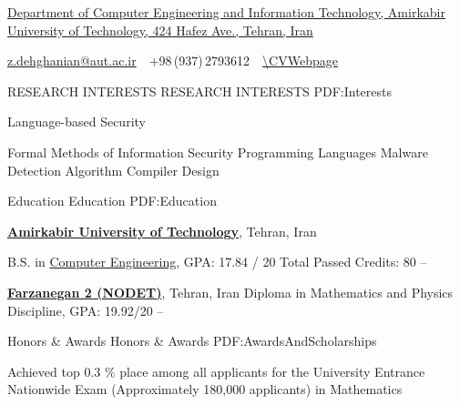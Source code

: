 \documentclass[letterpaper,MMMyyyy,nonstopmode]{simpleresumecv}
\newcommand{\CVAuthor}{Zahra Dehghanian}
\begin{document}

\Title{\CVAuthor}
\hline
\begin{SubTitle}
\href{https://www.google.com/maps/place/Amirkabir+University+of+Technology+(Polytechnic}
{Department of Computer Engineering and Information Technology, Amirkabir University of Technology, 424 Hafez Ave., Tehran, Iran}
\par
\href{mailto:z.dehghanian@aut.ac.ir}
{z.dehghanian@aut.ac.ir}
\,\SubBulletSymbol\,
+98\,(937)\,2793612
\,\SubBulletSymbol\,
\href{\CVWebpage}
{\url{\CVWebpage}}
\end{SubTitle}

\begin{Body}


\Section
{RESEARCH INTERESTS}
{RESEARCH INTERESTS}
{PDF:Interests}

\Entry

\BulletItem
Language-based Security


\BulletItem
Formal Methods of Information Security
\BulletItem
Programming Languages
\BulletItem
Malware Detection Algorithm
\BulletItem
Compiler Design


\Section
{Education}
{Education}
{PDF:Education}

\Entry
\Entry
\href{http://www.aut.ac.ir}
{\textbf{Amirkabir University of Technology}},
Tehran, Iran

\Gap
\BulletItem
B.S. in
\href{http://ceit.aut.ac.ir}
{Computer Engineering}, 
  GPA: 17.84 / 20
  Total Passed Credits: 80
\hfill
{} --  

\href{}
{\textbf{Farzanegan 2 (NODET)}},
Tehran, Iran
\BulletItem
Diploma in Mathematics and Physics Discipline, 
GPA: 19.92/20
\hfill
{}--

\begin{Detail}

\end{Detail}






\Section
{Honors \& \newline Awards}
{Honors \& Awards}
{PDF:AwardsAndScholarships}


\BulletItem
Achieved top 0.3 \% place among all applicants for the University Entrance Nationwide
Exam (Approximately 180,000 applicants) in Mathematics 
\hfill
{}
 


\end{Body}
\end{document}
